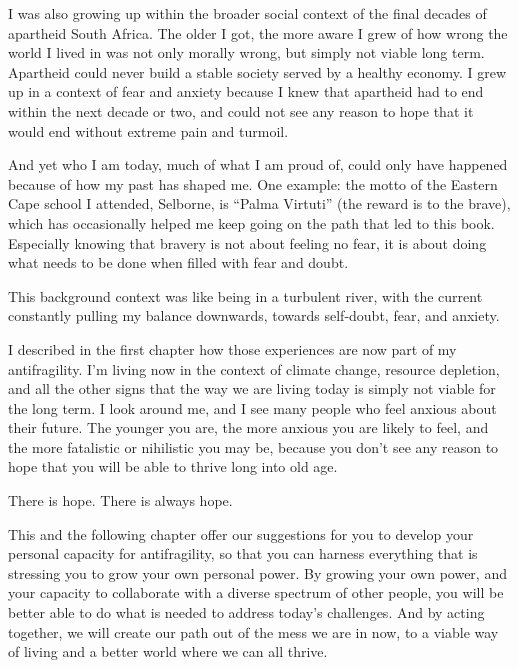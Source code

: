 \begin{longstoryblock}
I was also growing up within the broader social context of the final decades of apartheid South Africa.  The older I got, the more aware I grew of how wrong the world I lived in was not only morally wrong, but simply not viable long term. Apartheid could never build a stable society served by a healthy economy. I grew up in a context of fear and anxiety because I knew that apartheid had to end within the next decade or two, and could not see any reason to hope that it would end without extreme pain and turmoil.


And yet who I am today, much of what I am proud of, could only have happened because of how my past has shaped me. One example: the motto of the Eastern Cape school I attended, Selborne, is “Palma Virtuti” (the reward is to the brave), which has occasionally helped me keep going on the path that led to this book. Especially knowing that bravery is not about feeling no fear, it is about doing what needs to be done when filled with fear and doubt. 
\end{longstoryblock}


This background context was like being in a turbulent river, with the current constantly pulling my balance downwards, towards self-doubt, fear, and anxiety.


I described in the first chapter how those experiences are now part of my antifragility. I'm living now in the context of climate change, resource depletion, and all the other signs that the way we are living today is simply not viable for the long term. I look around me, and I see many people who feel anxious about their future. The younger you are, the more anxious you are likely to feel, and the more fatalistic or nihilistic you may be, because you don't see any reason to hope that you will be able to thrive long into old age.


There is hope. There is always hope. 


This and the following chapter offer our suggestions for you to develop your personal capacity for antifragility, so that you can harness everything that is stressing you to grow your own personal power. By growing your own power, and your capacity to collaborate with a diverse spectrum of other people, you will be better able to do what is needed to address today’s challenges. And by acting together, we will create our path out of the mess we are in now, to a viable way of living and a better world where we can all thrive.


